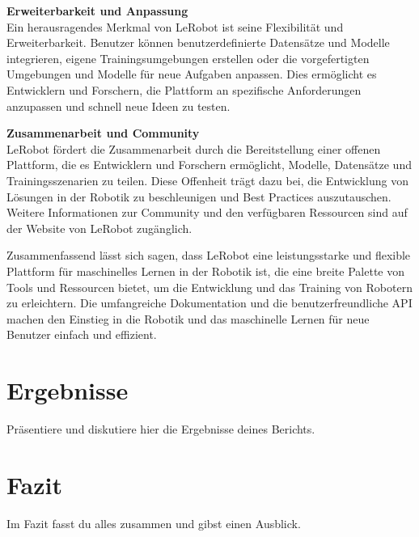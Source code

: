 \documentclass[a4paper, 12pt]{article}
\begin{document}
\textbf{Erweiterbarkeit und Anpassung}\\
Ein herausragendes Merkmal von LeRobot ist seine Flexibilität und Erweiterbarkeit. Benutzer können benutzerdefinierte Datensätze und Modelle integrieren, eigene Trainingsumgebungen erstellen oder die vorgefertigten Umgebungen und Modelle für neue Aufgaben anpassen. Dies ermöglicht es Entwicklern und Forschern, die Plattform an spezifische Anforderungen anzupassen und schnell neue Ideen zu testen.

\textbf{Zusammenarbeit und Community}\\
LeRobot fördert die Zusammenarbeit durch die Bereitstellung einer offenen Plattform, die es Entwicklern und Forschern ermöglicht, Modelle, Datensätze und Trainingsszenarien zu teilen. Diese Offenheit trägt dazu bei, die Entwicklung von Lösungen in der Robotik zu beschleunigen und Best Practices auszutauschen. Weitere Informationen zur Community und den verfügbaren Ressourcen sind auf der Website von LeRobot zugänglich.

Zusammenfassend lässt sich sagen, dass LeRobot eine leistungsstarke und flexible Plattform für maschinelles Lernen in der Robotik ist, die eine breite Palette von Tools und Ressourcen bietet, um die Entwicklung und das Training von Robotern zu erleichtern. Die umfangreiche Dokumentation und die benutzerfreundliche API machen den Einstieg in die Robotik und das maschinelle Lernen für neue Benutzer einfach und effizient.


\newpage
\section{Ergebnisse}
Präsentiere und diskutiere hier die Ergebnisse deines Berichts.

\newpage
\section{Fazit}
Im Fazit fasst du alles zusammen und gibst einen Ausblick.

\newpage


\end{document}
